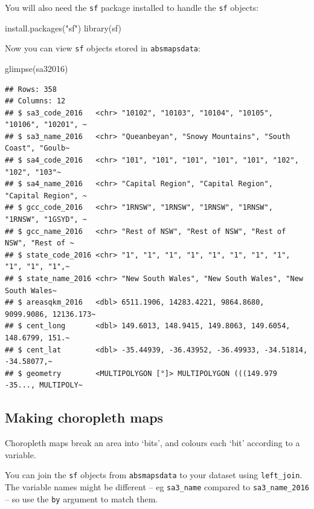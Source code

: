 \documentclass[
]{book}
\newenvironment{Shaded}{\begin{snugshade}}{\end{snugshade}}
\newcommand{\FunctionTok}[1]{\textcolor[rgb]{0.00,0.00,0.00}{#1}}
\newcommand{\NormalTok}[1]{#1}
\newcommand{\StringTok}[1]{\textcolor[rgb]{0.31,0.60,0.02}{#1}}
\begin{document}
You will also need the \texttt{sf} package installed to handle the \texttt{sf} objects:

\begin{Shaded}
\begin{Highlighting}[]
\FunctionTok{install.packages}\NormalTok{(}\StringTok{"sf"}\NormalTok{)}
\FunctionTok{library}\NormalTok{(sf)}
\end{Highlighting}
\end{Shaded}

Now you can view \texttt{sf} objects stored in \texttt{absmapsdata}:

\begin{Shaded}
\begin{Highlighting}[]
\FunctionTok{glimpse}\NormalTok{(sa32016)}
\end{Highlighting}
\end{Shaded}

\begin{verbatim}
## Rows: 358
## Columns: 12
## $ sa3_code_2016   <chr> "10102", "10103", "10104", "10105", "10106", "10201", ~
## $ sa3_name_2016   <chr> "Queanbeyan", "Snowy Mountains", "South Coast", "Goulb~
## $ sa4_code_2016   <chr> "101", "101", "101", "101", "101", "102", "102", "103"~
## $ sa4_name_2016   <chr> "Capital Region", "Capital Region", "Capital Region", ~
## $ gcc_code_2016   <chr> "1RNSW", "1RNSW", "1RNSW", "1RNSW", "1RNSW", "1GSYD", ~
## $ gcc_name_2016   <chr> "Rest of NSW", "Rest of NSW", "Rest of NSW", "Rest of ~
## $ state_code_2016 <chr> "1", "1", "1", "1", "1", "1", "1", "1", "1", "1", "1",~
## $ state_name_2016 <chr> "New South Wales", "New South Wales", "New South Wales~
## $ areasqkm_2016   <dbl> 6511.1906, 14283.4221, 9864.8680, 9099.9086, 12136.173~
## $ cent_long       <dbl> 149.6013, 148.9415, 149.8063, 149.6054, 148.6799, 151.~
## $ cent_lat        <dbl> -35.44939, -36.43952, -36.49933, -34.51814, -34.58077,~
## $ geometry        <MULTIPOLYGON [°]> MULTIPOLYGON (((149.979 -35..., MULTIPOLY~
\end{verbatim}

\hypertarget{making-choropleth-maps}{%
\subsection{Making choropleth maps}\label{making-choropleth-maps}}

Choropleth maps break an area into `bits', and colours each `bit' according to a variable.

You can join the \texttt{sf} objects from \texttt{absmapsdata} to your dataset using \texttt{left\_join}. The variable names might be different -- eg \texttt{sa3\_name} compared to \texttt{sa3\_name\_2016} -- so use the \texttt{by} argument to match them.
\end{document}

